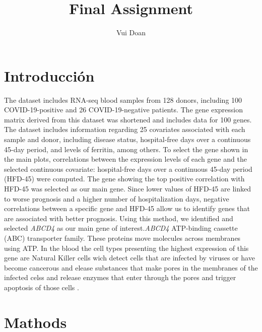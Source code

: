 \documentclass[11pt,a4paper]{article}
\title{\textbf{Final Assignment }}
\author[1]{ Vui  Doan }
\date{} %
\begin{document}
\maketitle

\section{Introducción}

The dataset includes RNA-seq blood samples from 128 donors, including 100 COVID-19-positive and 26 COVID-19-negative patients. The gene expression matrix derived from this dataset was shortened and includes data for 100 genes. The dataset includes information regarding 25 covariates associated with each sample and donor, including disease status, hospital-free days over a continuous 45-day period, and levels of ferritin, among others. To select the gene shown in the main plots, correlations between the expression levels of each gene and the selected continuous covariate: hospital-free days over a continuous 45-day period (HFD-45) were computed. The gene showing the top positive correlation with HFD-45 was selected as our main gene. Since lower values of HFD-45 are linked to worse prognosis and a higher number of hospitalization days, negative correlations between a specific gene and HFD-45 allow us to identify genes that are associated with better prognosis. Using this method, we identified and selected \textit{ABCD4} as our main gene of interest.\textit{ABCD4}  ATP-binding cassette (ABC) transporter family. These proteins move molecules across  membranes using ATP. In the blood the cell types presenting the highest expression of this gene are Natural Killer cells wich detect cells that are infected by viruses or have become cancerous and elease substances that make pores in the membranes of the infected celss and release enzymes that enter through the pores and trigger apoptosis of those cells \cite{Ref2}.

\section{Mathods}
\end{document}
